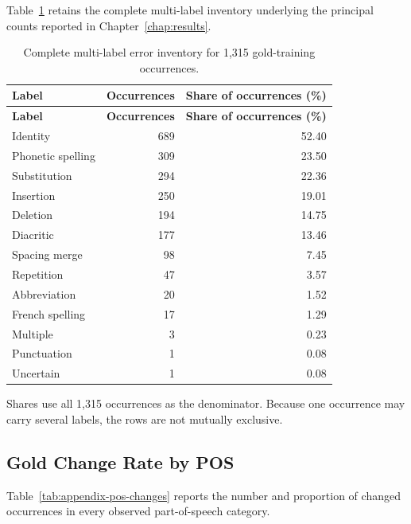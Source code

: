 \documentclass[12pt, a4paper, twoside, openany]{report}
\begin{document}
Table~\ref{tab:appendix-gold-errors} retains the complete multi-label inventory underlying the principal counts reported in Chapter~\ref{chap:results}.

\begin{longtable}{lrr}
	\caption{Complete multi-label error inventory for 1,315 gold-training occurrences.}\label{tab:appendix-gold-errors}\\
	\toprule
	\textbf{Label} & \textbf{Occurrences} & \textbf{Share of occurrences (\%)} \\
	\midrule
	\endfirsthead
	\toprule
	\textbf{Label} & \textbf{Occurrences} & \textbf{Share of occurrences (\%)} \\
	\midrule
	\endhead
	Identity & 689 & 52.40 \\
	Phonetic spelling & 309 & 23.50 \\
	Substitution & 294 & 22.36 \\
	Insertion & 250 & 19.01 \\
	Deletion & 194 & 14.75 \\
	Diacritic & 177 & 13.46 \\
	Spacing merge & 98 & 7.45 \\
	Repetition & 47 & 3.57 \\
	Abbreviation & 20 & 1.52 \\
	French spelling & 17 & 1.29 \\
	Multiple & 3 & 0.23 \\
	Punctuation & 1 & 0.08 \\
	Uncertain & 1 & 0.08 \\
	\bottomrule
\end{longtable}

Shares use all 1,315 occurrences as the denominator. Because one occurrence may carry several labels, the rows are not mutually exclusive.

\subsection{Gold Change Rate by POS}

Table~\ref{tab:appendix-pos-changes} reports the number and proportion of changed occurrences in every observed part-of-speech category.
\end{document}
